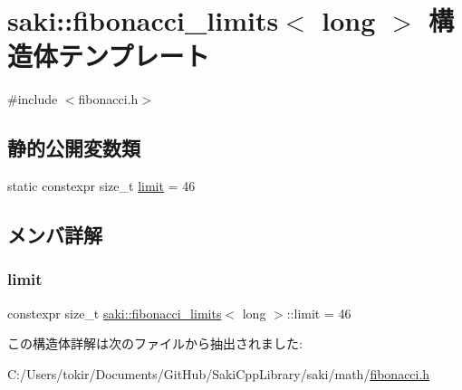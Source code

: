 \hypertarget{structsaki_1_1fibonacci__limits_3_01long_01_4}{}\section{saki\+:\+:fibonacci\+\_\+limits$<$ long $>$ 構造体テンプレート}
\label{structsaki_1_1fibonacci__limits_3_01long_01_4}


{\ttfamily \#include $<$fibonacci.\+h$>$}

\subsection*{静的公開変数類}
\begin{DoxyCompactItemize}
\item 
static constexpr size\+\_\+t \mbox{\hyperlink{structsaki_1_1fibonacci__limits_3_01long_01_4_a64398e08df2e7cba5ccaed816776a5fc}{limit}} = 46
\end{DoxyCompactItemize}


\subsection{メンバ詳解}
\mbox{\label{structsaki_1_1fibonacci__limits_3_01long_01_4_a64398e08df2e7cba5ccaed816776a5fc}} 
\subsubsection{\texorpdfstring{limit}{limit}}
{\footnotesize\ttfamily constexpr size\+\_\+t \mbox{\hyperlink{structsaki_1_1fibonacci__limits}{saki\+::fibonacci\+\_\+limits}}$<$ long $>$\+::limit = 46\hspace{0.3cm}{\ttfamily [static]}}



この構造体詳解は次のファイルから抽出されました\+:\begin{DoxyCompactItemize}
\item 
C\+:/\+Users/tokir/\+Documents/\+Git\+Hub/\+Saki\+Cpp\+Library/saki/math/\mbox{\hyperlink{fibonacci_8h}{fibonacci.\+h}}\end{DoxyCompactItemize}
